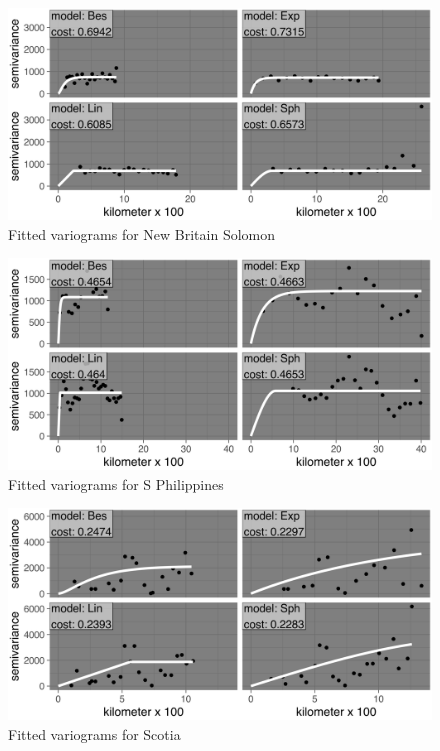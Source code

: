 \begin{figure}
\centering
\includegraphics{assets/figs/chpt3/NewBritainSolomonVgrms.png}
\caption[Fitted variograms for New Britain Solomon]{Fitted variograms for New Britain Solomon}
\end{figure}

\begin{figure}
\centering
\includegraphics{assets/figs/chpt3/SPhilippinesVgrms.png}
\caption[Fitted variograms for S Philippines]{Fitted variograms for S Philippines}
\end{figure}

\begin{figure}
\centering
\includegraphics{assets/figs/chpt3/ScotiaVgrms.png}
\caption[Fitted variograms for Scotia]{Fitted variograms for Scotia}
\end{figure}

